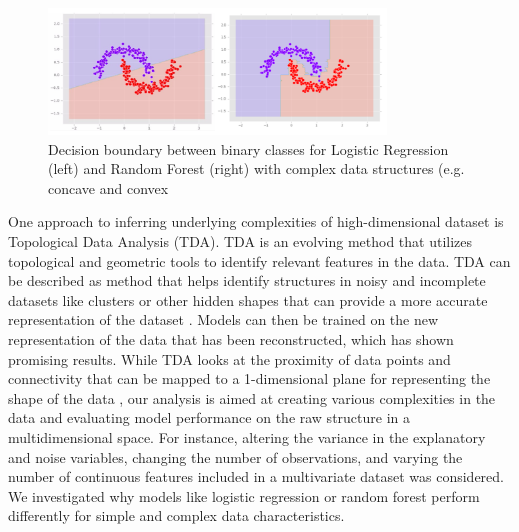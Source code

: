 \documentclass{llncs}
\begin{document}
\begin{figure}
\centering
\includegraphics[width=0.8\textwidth]{decisionboundary2.png}
\caption{Decision boundary between binary classes for Logistic Regression (left) and Random Forest (right) with complex data structures (e.g. concave and convex}
\label{fig:boundary2}
\end{figure}

One approach to inferring underlying complexities of high-dimensional dataset is Topological Data Analysis (TDA). TDA is an evolving method that utilizes topological and geometric tools to identify relevant features in the data. TDA can be described as method that helps identify structures in noisy and incomplete datasets like clusters or other hidden shapes that can provide a more accurate representation of the dataset \cite{chazal}. Models can then be trained on the new representation of the data that has been reconstructed, which has shown promising results. While TDA looks at the proximity of data points and connectivity that can be mapped to a 1-dimensional plane for representing the shape of the data \cite{munch}, our analysis is aimed at creating various complexities in the data and evaluating model performance on the raw structure in a multidimensional space. For instance, altering the variance in the explanatory and noise variables, changing the number of observations, and varying the number of continuous features included in a multivariate dataset was considered. We investigated why models like logistic regression or random forest perform differently for simple and complex data characteristics. 
\end{document}
